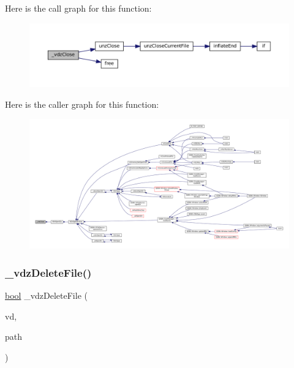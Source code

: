 Here is the call graph for this function\+:
\nopagebreak
\begin{figure}[H]
\begin{center}
\leavevmode
\includegraphics[width=350pt]{vfs-zip_8c_ab0c37e0c87dc08d24f8acda1bd6603c9_cgraph}
\end{center}
\end{figure}
Here is the caller graph for this function\+:
\nopagebreak
\begin{figure}[H]
\begin{center}
\leavevmode
\includegraphics[width=350pt]{vfs-zip_8c_ab0c37e0c87dc08d24f8acda1bd6603c9_icgraph}
\end{center}
\end{figure}
\mbox{\label{vfs-zip_8c_a05fa3cb4db94757aeccb05240732b2dc}} 
\subsubsection{\texorpdfstring{\+\_\+vdz\+Delete\+File()}{\_vdzDeleteFile()}}
{\footnotesize\ttfamily \mbox{\hyperlink{libretro_8h_a4a26dcae73fb7e1528214a068aca317e}{bool}} \+\_\+vdz\+Delete\+File (\begin{DoxyParamCaption}\item[{struct V\+Dir $\ast$}]{vd,  }\item[{const char $\ast$}]{path }\end{DoxyParamCaption})\hspace{0.3cm}{\ttfamily [static]}}


